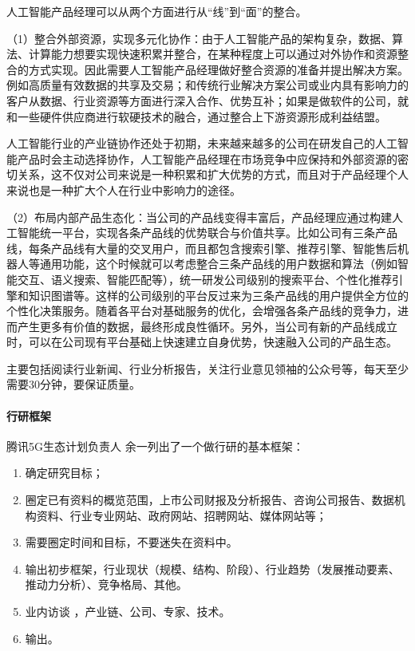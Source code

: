\documentclass[letterpaper,11pt,english]{sphinxmanual}
\begin{document}
人工智能产品经理可以从两个方面进行从“线”到“面”的整合。

（1）整合外部资源，实现多元化协作：由于人工智能产品的架构复杂，数据、算法、计算能力想要实现快速积累并整合，在某种程度上可以通过对外协作和资源整合的方式实现。因此需要人工智能产品经理做好整合资源的准备并提出解决方案。例如高质量有效数据的共享及交易；和传统行业解决方案公司或业内具有影响力的客户从数据、行业资源等方面进行深入合作、优势互补；如果是做软件的公司，就和一些硬件供应商进行软硬技术的融合，通过整合上下游资源形成利益结盟。

人工智能行业的产业链协作还处于初期，未来越来越多的公司在研发自己的人工智能产品时会主动选择协作，人工智能产品经理在市场竞争中应保持和外部资源的密切关系，这不仅对公司来说是一种积累和扩大优势的方式，而且对于产品经理个人来说也是一种扩大个人在行业中影响力的途径。

（2）布局内部产品生态化：当公司的产品线变得丰富后，产品经理应通过构建人工智能统一平台，实现各条产品线的优势联合与价值共享。比如公司有三条产品线，每条产品线有大量的交叉用户，而且都包含搜索引擎、推荐引擎、智能售后机器人等通用功能，这个时候就可以考虑整合三条产品线的用户数据和算法（例如智能交互、语义搜索、智能匹配等），统一研发公司级别的搜索平台、个性化推荐引擎和知识图谱等。这样的公司级别的平台反过来为三条产品线的用户提供全方位的个性化决策服务。随着各平台对基础服务的优化，会增强各条产品线的竞争力，进而产生更多有价值的数据，最终形成良性循环。另外，当公司有新的产品线成立时，可以在公司现有平台基础上快速建立自身优势，快速融入公司的产品生态。

主要包括阅读行业新闻、行业分析报告，关注行业意见领袖的公众号等，每天至少需要30分钟，要保证质量。


\paragraph{行研框架}
\label{\detokenize{chapter_knowledge/industry_analysis:id21}}
腾讯5G生态计划负责人 余一列出了一个做行研的基本框架：
\begin{enumerate}
%
\item {} 
确定研究目标；

\item {} 
圈定已有资料的概览范围，上市公司财报及分析报告、咨询公司报告、数据机构资料、行业专业网站、政府网站、招聘网站、媒体网站等；

\item {} 
需要圈定时间和目标，不要迷失在资料中。

\item {} 
输出初步框架，行业现状（规模、结构、阶段）、行业趋势（发展推动要素、推动力分析）、竞争格局、其他。

\item {} 
业内访谈 ，产业链、公司、专家、技术。

\item {} 
输出。

\end{enumerate}
\end{document}

